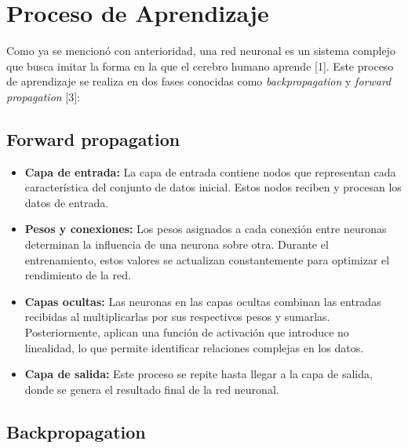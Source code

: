 \section{Proceso de Aprendizaje}
Como ya se mencionó con anterioridad, una red neuronal es un sistema complejo que busca imitar la forma en la que el cerebro humano aprende [1].
Este proceso de aprendizaje se realiza en dos fases conocidas como \textit{backpropagation} y \textit{forward propagation} [3]:


\subsection{Forward propagation}

\begin{itemize}
	\item \textbf{Capa de entrada:} La capa de entrada contiene nodos que representan cada característica del conjunto de datos inicial. Estos nodos reciben y procesan los datos de entrada.  
	\item \textbf{Pesos y conexiones:} Los pesos asignados a cada conexión entre neuronas determinan la influencia de una neurona sobre otra. Durante el entrenamiento, estos valores se actualizan constantemente para optimizar el rendimiento de la red.  
	\item \textbf{Capas ocultas:} Las neuronas en las capas ocultas combinan las entradas recibidas al multiplicarlas por sus respectivos pesos y sumarlas. Posteriormente, aplican una función de activación que introduce no linealidad, lo que permite identificar relaciones complejas en los datos.  
	\item \textbf{Capa de salida:} Este proceso se repite hasta llegar a la capa de salida, donde se genera el resultado final de la red neuronal.
\end{itemize}



\subsection{Backpropagation}

